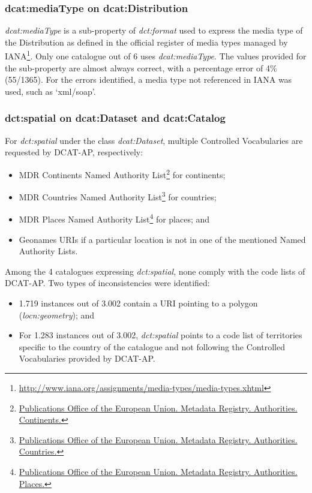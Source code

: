 \documentclass[<options>]{elsarticle}
\begin{document}
\subsubsection{dcat:mediaType on dcat:Distribution}
\textit{dcat:mediaType }is a sub-property of \textit{dct:format} used to express the media type of the Distribution as defined in the official register of media types managed by IANA\footnote{\href{http://www.iana.org/assignments/media-types/media-types.xhtml}{         http://www.iana.org/assignments/media-types/media-types.xhtml}}. Only one catalogue out of 6 uses \textit{dcat:mediaType}. The values provided for the sub-property are almost always correct, with a percentage error of 4\% (55/1365). For the errors identified, a media type not referenced in IANA was used, such as ‘xml/soap’.

\subsubsection{dct:spatial on dcat:Dataset and dcat:Catalog}
For \textit{dct:spatial} under the class \textit{dcat:Dataset}, multiple Controlled Vocabularies are requested by DCAT-AP, respectively:
\begin{itemize}
\item MDR Continents Named Authority List\footnote{\href{http://publications.europa.eu/mdr/authority/continent/
}{Publications Office of the European Union. Metadata Registry. Authorities. Continents.}} for continents;
\item MDR Countries Named Authority List\footnote{\href{http://publications.europa.eu/mdr/authority/country/}{Publications Office of the European Union. Metadata Registry. Authorities. Countries.}} for countries;
\item MDR Places Named Authority List\footnote{\href{    http://publications.europa.eu/mdr/authority/place/}{Publications Office of the European Union. Metadata Registry. Authorities. Places.}} for places; and
\item Geonames URIs if a particular location is not in one of the mentioned Named Authority Lists.
\end{itemize}

Among the 4 catalogues expressing \textit{dct:spatial}, none comply with the code lists of DCAT-AP. Two types of inconsistencies were identified:
\begin{itemize}
\item 1.719 instances out of 3.002 contain a URI pointing to a polygon (\textit{locn:geometry}); and
\item For 1.283 instances out of 3.002, \textit{dct:spatial} points to a code list of territories specific to the country of the catalogue and not following the Controlled Vocabularies provided by DCAT-AP.
% 
% 
\end{itemize}
\end{document}
